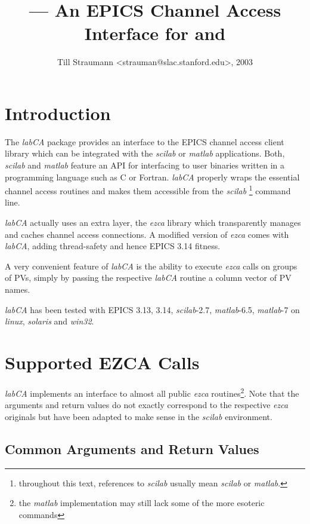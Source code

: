 \documentclass{article}
\title{\sca{} --- An EPICS Channel Access Interface for \scilab{} and \matlab{}}
\author{Till Straumann <strauman@slac.stanford.edu>, 2003}
\newcommand{\sca}{{\em labCA}}
\newcommand{\scilab}{{\em scilab}}
\newcommand{\matlab}{{\em matlab}}
\newcommand{\windoze}{{\em win32}}
\newcommand{\ezca}{{\em ezca}}
\begin{document}
\maketitle
{\hspace*{\fill}{\small\verb$Id: manual.tex,v 1.4 2003/12/24 19:58:15 till Exp$}\hspace*{\fill}}
\section{Introduction}

The \sca{} package provides an interface to the
EPICS channel access client library which can be
integrated with the \scilab{} or \matlab{} applications.
Both, \scilab{} and \matlab{} feature an API for interfacing
to user binaries written in a programming language such
as C or Fortran. \sca{} properly wraps the essential
channel access routines and makes them accessible
from the \scilab%
\footnote{throughout this text, references to \scilab{}
usually mean \scilab{} or \matlab.}
command line.

\sca{} actually uses an extra layer, the \ezca{} library
which transparently manages and caches channel access 
connections. A modified version of \ezca{} comes with
\sca, adding thread-safety and hence EPICS 3.14 fitness.

A very convenient feature of \sca{} is the ability
to execute \ezca{} calls on groups of PVs, simply by
passing the respective \sca{} routine a column vector
of PV names.

\sca{} has been tested with EPICS 3.13, 3.14, \scilab-2.7,
\matlab-6.5, \matlab-7 on {\em linux}, {\em solaris} and
\windoze.

\section{Supported EZCA Calls}
\sca{} implements an interface to almost all public
\ezca{} routines\footnote{%
the \matlab{} implementation may still lack some of the
more esoteric commands}. Note that the arguments and
return values do not exactly correspond to the respective
\ezca{} originals but have been adapted to make sense
in the  \scilab{} environment.

\subsection{Common Arguments and Return Values}
\end{document}
